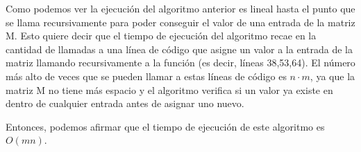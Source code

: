 \documentclass[12pt]{article}
\begin{document}
Como podemos ver la ejecución del algoritmo anterior es lineal hasta el punto que se llama recursivamente para poder conseguir el valor de una entrada de la matriz M. Esto quiere decir que el tiempo de ejecución del algoritmo recae en la cantidad de llamadas a una línea de código que asigne un valor a la entrada de la matriz llamando recursivamente a la función (es decir, líneas 38,53,64). El número más alto de veces que se pueden llamar a estas líneas de código es $n \cdot m$, ya que la matriz M no tiene más espacio y el algoritmo verifica si un valor ya existe en dentro de cualquier entrada antes de asignar uno nuevo.

Entonces, podemos afirmar que el tiempo de ejecución de este algoritmo es $O(mn)$.
\end{document}
